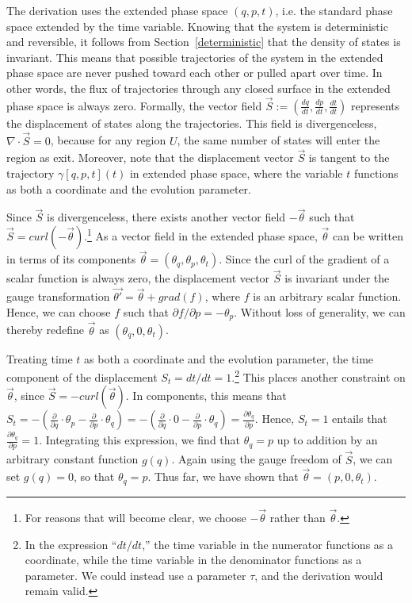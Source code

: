 \documentclass[12pt, english, twoside]{article} %
\renewcommand{\vector}[1]{\ensuremath{\vec{#1}}} %
\begin{document}
The derivation uses the extended phase space $(q, p, t)$, i.e. the standard phase space extended by the time variable. Knowing that the system is deterministic and reversible, it follows from Section~\ref{deterministic} that the density of states is invariant. This means that possible trajectories of the system in the extended phase space are never pushed toward each other or pulled apart over time. In other words, the flux of trajectories through any closed surface in the extended phase space is always zero. Formally, the vector field $\vec{S} := (\frac{d q }{d t }, \frac{d p }{d t }, \frac{d t }{d t })$ represents the displacement of states along the trajectories. This field is divergenceless, $\nabla \cdot \vector{S} = 0$, because for any region $U$, the same number of states will enter the region as exit. Moreover, note that the displacement vector $\vec{S}$ is tangent to the trajectory $\gamma [q, p, t] (t)$ in extended phase space, where the variable $t$ functions as both a coordinate and the evolution parameter.

Since $\vector{S}$ is divergenceless, there exists another vector field $-\vector{\theta}$ such that $\vector{S} = curl(-\vector{\theta} )$.\footnote{For reasons that will become clear, we choose $-\vector{\theta}$ rather than $\vector{\theta}$.} As a vector field in the extended phase space, $\vector{\theta}$ can be written in terms of its components $\vector{\theta} = (\theta_q, \theta_p, \theta_t) $. Since the curl of the gradient of a scalar function is always zero, the displacement vector $\vector{S}$ is invariant under the gauge transformation $\vector{\theta'} =\vector{\theta} + grad(f)$, where $f$ is an arbitrary scalar function. Hence, we can choose $f$ such that $\partial f/ \partial p = -\theta_p $. Without loss of generality, we can thereby redefine $\vector{\theta}$ as $(\theta_q, 0, \theta_t) $.

Treating time $t$ as both a coordinate and the evolution parameter, the time component of the displacement $S_t = dt/ dt = 1$.\footnote{In the expression ``$dt/dt$,'' the time variable in the numerator functions as a coordinate, while the time variable in the denominator functions as a parameter. We could instead use a parameter $\tau$, and the derivation would remain valid.} This places another constraint on $\vector{\theta} $, since $\vector{S} = -curl(\vector{\theta}) $. In components, this means that $S_t = - (\frac{\partial}{\partial q} \cdot \theta_p - \frac{\partial}{\partial p} \cdot \theta_q) = - (\frac{\partial}{\partial q} \cdot 0 - \frac{\partial}{\partial p} \cdot \theta_q) = \frac{\partial \theta_q}{\partial p}$. Hence, $S_t = 1$ entails that $\frac{\partial \theta_q}{\partial p} = 1$. Integrating this expression, we find that $\theta_q = p$ up to addition by an arbitrary constant function $g(q)$. Again using the gauge freedom of $\vector{S}$, we can set $g(q)=0$, so that $\theta_q = p$. Thus far, we have shown that $\vector{\theta} = (p, 0,\theta_t) $.
\end{document}
